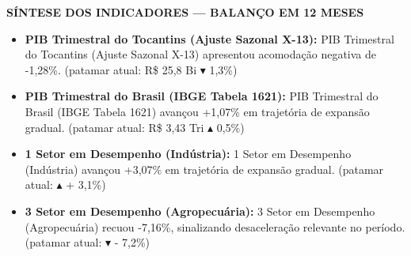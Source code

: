 \documentclass[10pt,a4paper]{article}
\begin{document}
\vspace{0.03cm}
\par\vspace{0.05cm}
\par\vspace{4pt}
{\fontsize{7.8}{9.4}\selectfont\bfseries\color{corprimaria}\MakeUppercase{Síntese dos Indicadores — Balanço em 12 Meses}}\par\vspace{2pt}
{\scriptsize\color{cinzatexto}
\begin{itemize}[leftmargin=10pt, itemsep=1.2pt, topsep=1pt, parsep=0pt]
   \item \textbf{\color{corprimaria}PIB Trimestral do Tocantins (Ajuste Sazonal X-13):} PIB Trimestral do Tocantins (Ajuste Sazonal X-13) apresentou acomodação negativa de -1,28\%. (patamar atual: R\$ 25,8 Bi $\blacktriangledown$ 1,3\%)
   \item \textbf{\color{corprimaria}PIB Trimestral do Brasil (IBGE Tabela 1621):} PIB Trimestral do Brasil (IBGE Tabela 1621) avançou +1,07\% em trajetória de expansão gradual. (patamar atual: R\$ 3,43 Tri $\blacktriangle$ 0,5\%)
   \item \textbf{\color{corprimaria}1\textordmasculine{} Setor em Desempenho (Indústria):} 1\textordmasculine{} Setor em Desempenho (Indústria) avançou +3,07\% em trajetória de expansão gradual. (patamar atual: $\blacktriangle$ + 3,1\%)
   \item \textbf{\color{corprimaria}3\textordmasculine{} Setor em Desempenho (Agropecuária):} 3\textordmasculine{} Setor em Desempenho (Agropecuária) recuou -7,16\%, sinalizando desaceleração relevante no período. (patamar atual: $\blacktriangledown$ - 7,2\%)
\end{itemize}
}
\par\vspace{0.05cm}
\end{document}
